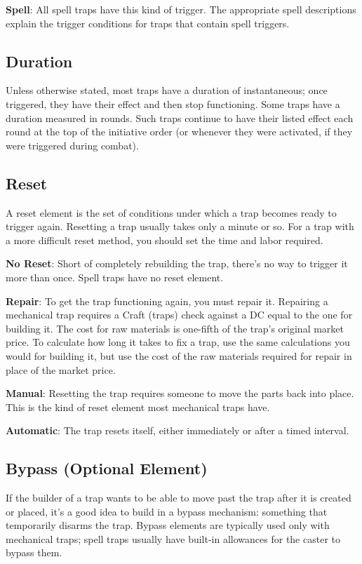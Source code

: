 \textbf{Spell}: All spell traps have this kind of trigger. The appropriate spell descriptions explain the trigger conditions for traps that contain spell triggers.
				
\subsection{Duration}

				
Unless otherwise stated, most traps have a duration of instantaneous; once triggered, they have their effect and then stop functioning. Some traps have a duration measured in rounds. Such traps continue to have their listed effect each round at the top of the initiative order (or whenever they were activated, if they were triggered during combat).
				
\subsection{Reset}

				
A reset element is the set of conditions under which a trap becomes ready to trigger again. Resetting a trap usually takes only a minute or so. For a trap with a more difficult reset method, you should set the time and labor required.
				
\textbf{No Reset}: Short of completely rebuilding the trap, there's no way to trigger it more than once. Spell traps have no reset element. 
				
\textbf{Repair}: To get the trap functioning again, you must repair it. Repairing a mechanical trap requires a Craft (traps) check against a DC equal to the one for building it. The cost for raw materials is one-fifth of the trap's original market price. To calculate how long it takes to fix a trap, use the same calculations you would for building it, but use the cost of the raw materials required for repair in place of the market price.
				
\textbf{Manual}: Resetting the trap requires someone to move the parts back into place. This is the kind of reset element most mechanical traps have.
				
\textbf{Automatic}: The trap resets itself, either immediately or after a timed interval.
				
\subsection{Bypass (Optional Element)}

				
If the builder of a trap wants to be able to move past the trap after it is created or placed, it's a good idea to build in a bypass mechanism: something that temporarily disarms the trap. Bypass elements are typically used only with mechanical traps; spell traps usually have built-in allowances for the caster to bypass them.
				
